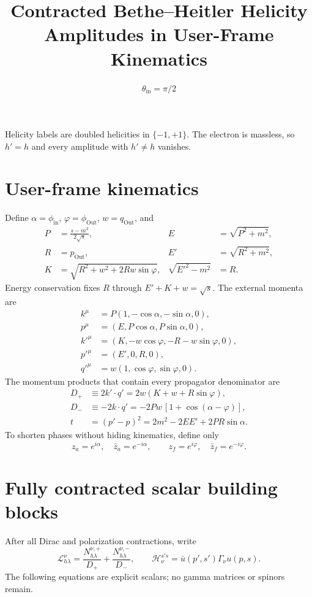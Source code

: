 \documentclass[10pt]{article}
\begin{document}
\title{Contracted Bethe--Heitler Helicity Amplitudes in User-Frame Kinematics}
\author{$\theta_{\mathrm{in}}=\pi/2$}
\date{}
\maketitle
Helicity labels are doubled helicities in $\{-1,+1\}$. The electron is massless, so $h'=h$ and every amplitude with $h'\ne h$ vanishes.
\section*{User-frame kinematics}
Define $\alpha=\phi_{\mathrm{in}}$, $\varphi=\phi_{\mathrm{Out}}$, $w=q_{\mathrm{Out}}$, and
\begin{align*}
P&=\frac{s-m^2}{2\sqrt{s}}, & E&=\sqrt{P^2+m^2},\\
R&=p_{\mathrm{Out}}, & E'&=\sqrt{R^2+m^2},\\
K&=\sqrt{R^2+w^2+2Rw\sin\varphi}, &
\sqrt{E'^2-m^2}&=R.
\end{align*}
Energy conservation fixes $R$ through $E'+K+w=\sqrt{s}$. The external momenta are
\begin{align*}
k^\mu&=P(1,-\cos\alpha,-\sin\alpha,0),\\
p^\mu&=(E,P\cos\alpha,P\sin\alpha,0),\\
k'^\mu&=(K,-w\cos\varphi,-R-w\sin\varphi,0),\\
p'^\mu&=(E',0,R,0),\\
q'^\mu&=w(1,\cos\varphi,\sin\varphi,0).
\end{align*}
The momentum products that contain every propagator denominator are
\begin{align*}
D_+&\equiv2k'\!\cdot q'=2w(K+w+R\sin\varphi),\\
D_-&\equiv-2k\!\cdot q'=-2Pw\,[1+\cos(\alpha-\varphi)],\\
t&=(p'-p)^2=2m^2-2EE'+2PR\sin\alpha.
\end{align*}
To shorten phases without hiding kinematics, define only
\[z_a=e^{i\alpha},\quad \bar z_a=e^{-i\alpha},\qquad z_f=e^{i\varphi},\quad \bar z_f=e^{-i\varphi}.\]
\section*{Fully contracted scalar building blocks}
After all Dirac and polarization contractions, write
\[\mathcal L^\nu_{h\lambda}=\frac{N^{\nu,+}_{h\lambda}}{D_+}+\frac{N^{\nu,-}_{h\lambda}}{D_-},\qquad \mathcal H^{s's}_\nu=\bar u(p',s')\Gamma_\nu u(p,s).\]
The following equations are explicit scalars; no gamma matrices or spinors remain.
\end{document}
